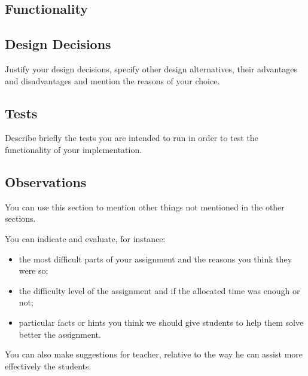\subsection{Functionality}



\subsection{Design Decisions}

Justify your design decisions, specify other design alternatives, their advantages and disadvantages and mention the reasons of your choice.  

\subsection{Tests}

Describe briefly the tests you are intended to run in order to test the functionality of your implementation.

\subsection{Observations}

You can use this section to mention other things not mentioned in the other sections. 

You can indicate and evaluate, for instance:
\begin{itemize}
	\item the most difficult parts of your assignment and the reasons you think they were so; 
	
	\item the difficulty level of the assignment and if the allocated time was enough or not; 

	\item particular facts or hints you think we should give students to help them solve better the assignment.

\end{itemize}

You can also make suggestions for teacher, relative to the way he can assist more effectively the students.
